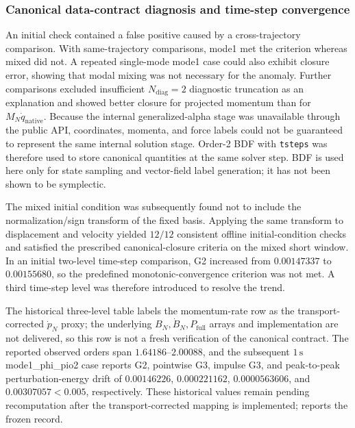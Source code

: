 

\subsubsection{Canonical data-contract diagnosis and time-step convergence}\label{sec:numerical-6-3-contract}

An initial check contained a false positive caused by a cross-trajectory comparison. With same-trajectory comparisons, mode1 met the criterion whereas mixed did not. A repeated single-mode mode1 case could also exhibit closure error, showing that modal mixing was not necessary for the anomaly. Further comparisons excluded insufficient \(N_{\mathrm{diag}}=2\) diagnostic truncation as an explanation and showed better closure for projected momentum than for \(M_N\dot q_{\mathrm{native}}\). Because the internal generalized-alpha stage was unavailable through the public API, coordinates, momenta, and force labels could not be guaranteed to represent the same internal solution stage. Order-2 BDF with \texttt{tsteps} was therefore used to store canonical quantities at the same solver step. BDF is used here only for state sampling and vector-field label generation; it has not been shown to be symplectic.

The mixed initial condition was subsequently found not to include the normalization/sign transform of the fixed basis. Applying the same transform to displacement and velocity yielded \(12/12\) consistent offline initial-condition checks and satisfied the prescribed canonical-closure criteria on the mixed short window. In an initial two-level time-step comparison, G2 increased from \(0.00147337\) to \(0.00155680\), so the predefined monotonic-convergence criterion was not met. A third time-step level was therefore introduced to resolve the trend.

The historical three-level table labels the momentum-rate row as the transport-corrected \(\dot p_N\) proxy; the underlying \(B_N,\dot B_N,P_{\mathrm{full}}\) arrays and implementation are not delivered, so this row is not a fresh verification of the canonical contract. The reported observed orders span \(1.64186\)--\(2.00088\), and the subsequent \(1\,\mathrm{s}\) mode1\_phi\_pio2 case reports G2, pointwise G3, impulse G3, and peak-to-peak perturbation-energy drift of \(0.00146226\), \(0.000221162\), \(0.0000563606\), and \(0.00307057<0.005\), respectively. These historical values remain pending recomputation after the transport-corrected mapping is implemented;  reports the frozen record.

